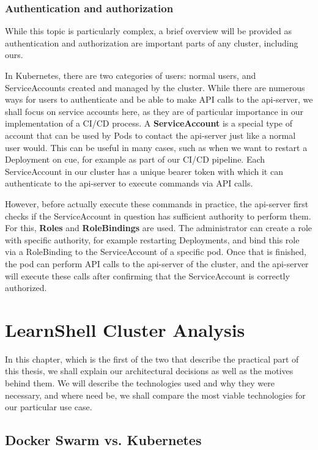 \documentclass[thesis=B,english]{FITthesis}[2019/12/23]
\begin{document}
\subsection{Authentication and authorization}

While this topic is particularly complex, a brief overview will be provided as authentication and authorization are important parts of any cluster, including ours.

In Kubernetes, there are two categories of users: normal users, and ServiceAccounts created and managed by the cluster. While there are numerous ways for users to authenticate and be able to make API calls to the api-server, we shall focus on service accounts here, as they are of particular importance in our implementation of a CI/CD process. A \textbf{ServiceAccount} is a special type of account that can be used by Pods to contact the api-server just like a normal user would. This can be useful in many cases, such as when we want to restart a Deployment on cue, for example as part of our CI/CD pipeline. Each ServiceAccount in our cluster has a unique bearer token with which it can authenticate to the api-server to execute commands via API calls.

However, before actually execute these commands in practice, the api-server first checks if the ServiceAccount in question has sufficient authority to perform them. For this, \textbf{Roles} and \textbf{RoleBindings} are used. The administrator can create a role with specific authority, for example restarting Deployments, and bind this role via a RoleBinding to the ServiceAccount of a specific pod. Once that is finished, the pod can perform API calls to the api-server of the cluster, and the api-server will execute these calls after confirming that the ServiceAccount is correctly authorized.


\chapter{LearnShell Cluster Analysis}

In this chapter, which is the first of the two that describe the practical part of this thesis, we shall explain our architectural decisions as well as the motives behind them. We will describe the technologies used and why they were necessary, and where need be, we shall compare the most viable technologies for our particular use case.

\section{Docker Swarm vs. Kubernetes}
\end{document}
